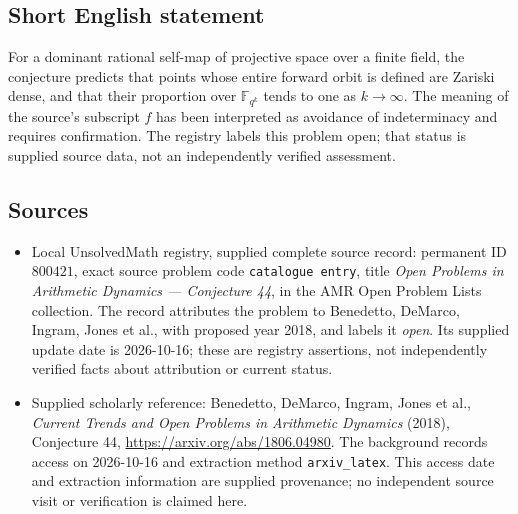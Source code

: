 \documentclass[11pt]{article}
\newcommand{\F}{\mathbb{F}}
\begin{document}
\subsection{Short English statement}
For a dominant rational self-map of projective space over a finite field, the conjecture predicts that points whose entire forward orbit is defined are Zariski dense, and that their proportion over \(\F_{q^k}\) tends to one as \(k\to\infty\). The meaning of the source's subscript \(f\) has been interpreted as avoidance of indeterminacy and requires confirmation. The registry labels this problem open; that status is supplied source data, not an independently verified assessment.
\subsection{Sources}
\begin{itemize}
\item Local UnsolvedMath registry, supplied complete source record: permanent ID \(800421\), exact source problem code \texttt{catalogue entry}, title \emph{Open Problems in Arithmetic Dynamics --- Conjecture 44}, in the AMR Open Problem Lists collection. The record attributes the problem to Benedetto, DeMarco, Ingram, Jones et al., with proposed year 2018, and labels it \emph{open}. Its supplied update date is 2026-10-16; these are registry assertions, not independently verified facts about attribution or current status.
\item Supplied scholarly reference: Benedetto, DeMarco, Ingram, Jones et al., \emph{Current Trends and Open Problems in Arithmetic Dynamics} (2018), Conjecture 44, \url{https://arxiv.org/abs/1806.04980}. The background records access on 2026-10-16 and extraction method \texttt{arxiv\_latex}. This access date and extraction information are supplied provenance; no independent source visit or verification is claimed here.
\end{itemize}
\end{document}
